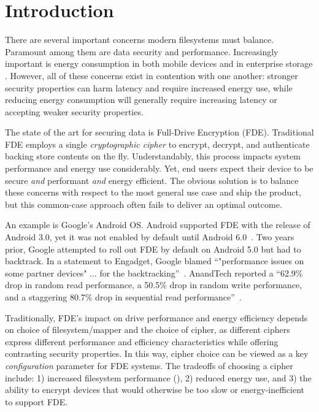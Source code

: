 \section{Introduction}\label{sec:introduction}

There are several important concerns modern filesystems must balance. Paramount
among them are data security and performance. Increasingly important is energy
consumption in both mobile devices and in enterprise storage
\cite{android-M-mobile-motivation, enterprise-motivation}. However, all of these
concerns exist in contention with one another: stronger security properties can
harm latency and require increased energy use, while reducing energy consumption
will generally require increasing latency or accepting weaker security
properties.

The state of the art for securing data is Full-Drive Encryption (FDE).
Traditional FDE employs a single \emph{cryptographic cipher} to encrypt,
decrypt, and authenticate backing store contents on the fly. Understandably,
this process impacts system performance and energy use considerably. Yet, end
users expect their device to be secure \emph{and} performant \emph{and} energy
efficient. The obvious solution is to balance these concerns with respect to the
most general use case and ship the product, but this common-case approach often
fails to deliver an optimal outcome.

An example is Google's Android OS. Android supported FDE with the release of
Android 3.0, yet it was not enabled by default until Android
6.0~\cite{android-M-mobile-motivation}. Two years prior, Google attempted to
roll out FDE by default on Android 5.0 but had to backtrack. In a statement to
Engadget, Google blamed ``"performance issues on some partner devices" ... for
the backtracking''~\cite{google-engadget}. AnandTech reported a ``62.9\% drop in
random read performance, a 50.5\% drop in random write performance, and a
staggering 80.7\% drop in sequential read
performance''~\cite{android-M-mobile-motivation-2}.

Traditionally, FDE's impact on drive performance and energy efficiency depends
on choice of filesystem/mapper and the choice of cipher, as different ciphers
express different performance and efficiency characteristics while offering
contrasting security properties. In this way, cipher choice can be viewed as a
key \emph{configuration} parameter for FDE systems. The tradeoffs of choosing
a cipher include: 1) increased filesystem performance (), 2) reduced energy use, and 3) the ability to encrypt devices that
would otherwise be too slow or energy-inefficient to support FDE.

